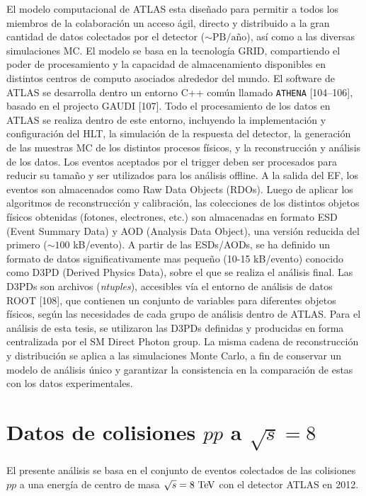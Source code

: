 El modelo computacional de ATLAS esta diseñado para permitir a todos los
miembros de la colaboración un acceso ágil, directo y distribuido a la gran
cantidad de datos colectados por el detector ($\sim \text{PB}/\text{a\~no}$),
así como a las diversas simulaciones MC. El modelo se basa en la tecnología
GRID, compartiendo el poder de procesamiento y la capacidad de almacenamiento
disponibles en distintos centros de computo asociados alrededor del mundo. El
software de ATLAS se desarrolla dentro un entorno C++ común llamado
\texttt{ATHENA} [104–106], basado en el projecto GAUDI [107]. Todo el
procesamiento de los datos en ATLAS se realiza dentro de este entorno,
incluyendo la implementación y configuración del HLT, la simulación de la
respuesta del detector, la generación de las muestras MC de los distintos
procesos físicos, y la reconstrucción y análisis de los datos. Los eventos
aceptados por el trigger deben ser procesados para reducir su tamaño y ser
utilizados para los análisis offline. A la salida del EF, los eventos son
almacenados como Raw Data Objects (RDOs). Luego de aplicar los algoritmos de
reconstrucción y calibración, las colecciones de los distintos objetos físicos
obtenidas (fotones, electrones, etc.) son almacenadas en formato ESD (Event
Summary Data) y AOD (Analysis Data Object), una versión reducida del primero
($\sim 100$ kB/evento). A partir de las ESDs/AODs, se ha definido un formato de
datos significativamente mas pequeño (10-15 kB/evento) conocido como D3PD
(Derived Physics Data), sobre el que se realiza el análisis final. Las D3PDs son
archivos (\emph{ntuples}), accesibles vía el entorno de análisis de datos ROOT
[108], que contienen un conjunto de variables para diferentes objetos físicos,
según las necesidades de cada grupo de análisis dentro de ATLAS. Para el
análisis de esta tesis, se utilizaron las D3PDs definidas y producidas en forma
centralizada por el SM Direct Photon group. La misma cadena de reconstrucción y
distribución se aplica a las simulaciones Monte Carlo, a fin de conservar un
modelo de análisis único y garantizar la consistencia en la comparación de estas
con los datos experimentales.


\section{Datos de colisiones $pp$ a $\sqrt{s} = 8$ \tev}

El presente análisis se basa en el conjunto de eventos colectados de las
colisiones $pp$ a una energía de centro de masa $\sqrt{s} = 8\tev$ con el
detector ATLAS en 2012.

